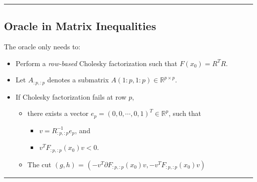 \documentclass[]{article}
\providecommand{\tightlist}{%
  \setlength{\itemsep}{0pt}\setlength{\parskip}{0pt}}
\begin{document}
\begin{center}\rule{0.5\linewidth}{\linethickness}\end{center}

\hypertarget{oracle-in-matrix-inequalities}{%
\subsection{Oracle in Matrix
Inequalities}\label{oracle-in-matrix-inequalities}}

The oracle only needs to:

\begin{itemize}
\tightlist
\item
  Perform a \emph{row-based} Cholesky factorization such that
  \(F(x_0) = R^T R\).
\item
  Let \(A_{:p,:p}\) denotes a submatrix
  \(A(1:p, 1:p) \in \mathbb{R}^{p\times p}\).
\item
  If Cholesky factorization fails at row \(p\),

  \begin{itemize}
  \tightlist
  \item
    there exists a vector
    \(e_p = (0, 0, \cdots, 0, 1)^T \in \mathbb{R}^p\), such that

    \begin{itemize}
    \tightlist
    \item
      \(v = R_{:p,:p}^{-1} e_p\), and
    \item
      \(v^T F_{:p,:p}(x_0) v < 0\).
    \end{itemize}
  \item
    The cut \((g, h)\) =
    \((-v^T \partial F_{:p,:p}(x_0) v, -v^T F_{:p,:p}(x_0) v)\)
  \end{itemize}
\end{itemize}

\begin{center}\rule{0.5\linewidth}{\linethickness}\end{center}
\end{document}
